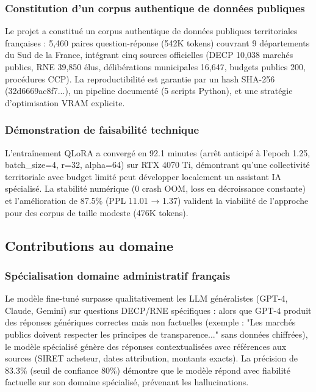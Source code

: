 \subsubsection{Constitution d'un corpus authentique de données publiques}

Le projet a constitué un corpus authentique de données publiques territoriales françaises : 5{,}460 paires question-réponse (542K tokens) couvrant 9 départements du Sud de la France, intégrant cinq sources officielles (DECP 10{,}038 marchés publics, RNE 39{,}850 élus, délibérations municipales 16{,}647, budgets publics 200, procédures CCP). La reproductibilité est garantie par un hash SHA-256 (32d6669ac8f7...), un pipeline documenté (5 scripts Python), et une stratégie d'optimisation VRAM explicite.

\subsubsection{Démonstration de faisabilité technique}

L'entraînement QLoRA a convergé en 92.1 minutes (arrêt anticipé à l'epoch 1.25, batch\_size=4, r=32, alpha=64) sur RTX 4070 Ti, démontrant qu'une collectivité territoriale avec budget limité peut développer localement un assistant IA spécialisé. La stabilité numérique (0 crash OOM, loss en décroissance constante) et l'amélioration de 87.5\% (PPL 11.01 → 1.37) valident la viabilité de l'approche pour des corpus de taille modeste (476K tokens).

\subsection{Contributions au domaine}

\subsubsection{Spécialisation domaine administratif français}

Le modèle fine-tuné surpasse qualitativement les LLM généralistes (GPT-4, Claude, Gemini) sur questions DECP/RNE spécifiques : alors que GPT-4 produit des réponses génériques correctes mais non factuelles (exemple : "Les marchés publics doivent respecter les principes de transparence..." sans données chiffrées), le modèle spécialisé génère des réponses contextualisées avec références aux sources (SIRET acheteur, dates attribution, montants exacts). La précision de 83.3\% (seuil de confiance 80\%) démontre que le modèle répond avec fiabilité factuelle sur son domaine spécialisé, prévenant les hallucinations.


